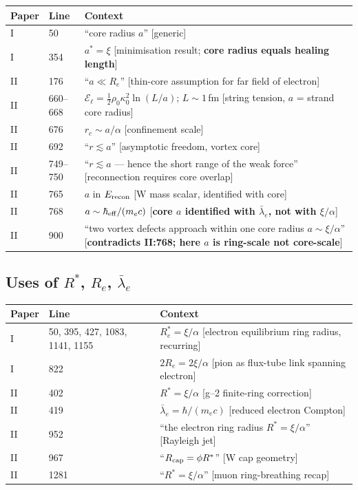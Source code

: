 \documentclass[11pt,a4paper]{article}
\begin{document}
\begin{longtable}{@{}llp{9cm}@{}}
\toprule
Paper & Line & Context \\
\midrule
\endhead
I  & 50   & ``core radius $a$'' [generic] \\
I  & 354  & $a^* = \xi$ [minimisation result; \textbf{core radius equals
            healing length}] \\
\midrule
II & 176  & ``$a \ll R_e$'' [thin-core assumption for far field of
            electron] \\
II & 660--668 & $\mathcal{E}_\ell = \tfrac{1}{2}\rho_0\kappa_0^2 \ln(L/a)$;
                $L \sim 1$\,fm [string tension, $a$ = strand core radius] \\
II & 676  & $r_c \sim a/\alpha$ [confinement scale] \\
II & 692  & ``$r \lesssim a$'' [asymptotic freedom, vortex core] \\
II & 749--750 & ``$r \lesssim a$ — hence the short range of the weak
                force'' [reconnection requires core overlap] \\
II & 765  & $a$ in $E_{\rm recon}$ [W mass scalar, identified with core] \\
II & 768  & $a \sim \hbar_{\rm eff}/(m_e c)$
            [\textbf{core $a$ identified with $\bar\lambda_e$, not with
            $\xi/\alpha$}] \\
II & 900  & ``two vortex defects approach within one core radius $a \sim
            \xi/\alpha$'' [\textbf{contradicts II:768; here $a$ is
            ring-scale not core-scale}] \\
\bottomrule
\end{longtable}

\subsection{Uses of $R^*$, $R_e$, $\bar\lambda_e$}

\begin{longtable}{@{}llp{9cm}@{}}
\toprule
Paper & Line & Context \\
\midrule
\endhead
I  & 50, 395, 427, 1083, 1141, 1155 & $R_e^* = \xi/\alpha$
                  [electron equilibrium ring radius, recurring] \\
I  & 822  & $2R_e = 2\xi/\alpha$ [pion as flux-tube link spanning electron] \\
\midrule
II & 402  & $R^* = \xi/\alpha$ [g--2 finite-ring correction] \\
II & 419  & $\bar\lambda_e = \hbar/(m_e c)$ [reduced electron Compton] \\
II & 952  & ``the electron ring radius $R^* = \xi/\alpha$'' [Rayleigh jet] \\
II & 967  & ``$R_{\rm cap} = \phi R^*$'' [W cap geometry] \\
II & 1281 & ``$R^* = \xi/\alpha$'' [muon ring-breathing recap] \\
\bottomrule
\end{longtable}
\end{document}
